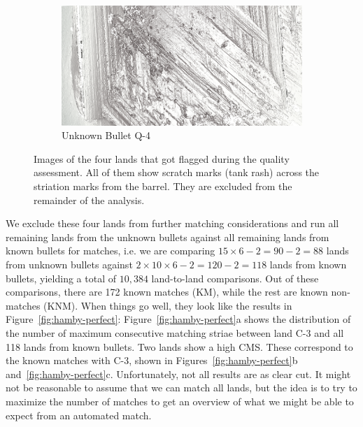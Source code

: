 \documentclass[aoas, preprint]{imsart}\usepackage[]{graphicx}\usepackage[]{color}
\begin{document}
\begin{figure}
\begin{subfigure}[t]{.49\textwidth}
\end{subfigure}
\begin{subfigure}[t]{.49\textwidth}\centering
\caption{Unknown Bullet Q-4}
\includegraphics[width=\textwidth]{images/q-4-grey.png}
\end{subfigure}
\caption{\label{fig:fourflags}Images of the four lands that got flagged during the quality assessment. All of them show scratch marks (tank rash) across the striation marks from the barrel. They are excluded from the remainder of the analysis.}
\end{figure}
%
We exclude these four lands from further matching considerations and
 run all remaining lands from the unknown bullets against all remaining lands from known bullets for matches, i.e. we are comparing $15 \times 6 -2 = 90 - 2 = 88$ lands from unknown bullets against $2 \times 10 \times 6 -2 = 120 - 2 = 118$ lands from known bullets, yielding a total of $10,384$ land-to-land comparisons. Out of these comparisons, there are 172 known matches (KM), while the rest are known non-matches (KNM). 
 When things go well, they look like the results in Figure~\ref{fig:hamby-perfect}: Figure~\ref{fig:hamby-perfect}a shows the distribution of the number of maximum consecutive matching striae between land C-3 and all 118 lands from known bullets. Two lands show a high CMS. These correspond to the known matches with C-3, shown in Figures~\ref{fig:hamby-perfect}b and~\ref{fig:hamby-perfect}c. 
 Unfortunately, not all results are as clear cut. 
It might not be reasonable to assume that we can match all lands, but the idea is to try to maximize the number of matches to get an overview of what we might be able to expect from an automated match. 
\end{document}
